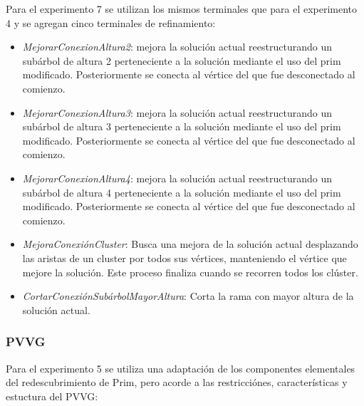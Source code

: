 Para el experimento 7 se utilizan los mismos terminales que para el experimento 4 y se agregan cinco terminales de refinamiento:

\begin{itemize}

\item \textit{MejorarConexionAltura2}: mejora la solución actual  reestructurando un subárbol de altura 2 perteneciente a la solución mediante el uso del prim modificado. Posteriormente se conecta al vértice del que fue desconectado al comienzo. 

\item \textit{MejorarConexionAltura3}: mejora la solución actual  reestructurando un subárbol de altura 3 perteneciente a la solución mediante el uso del prim modificado. Posteriormente se conecta al vértice del que fue desconectado al comienzo.

\item \textit{MejorarConexionAltura4}: mejora la solución actual  reestructurando un subárbol de altura 4 perteneciente a la solución mediante el uso del prim modificado. Posteriormente se conecta al vértice del que fue desconectado al comienzo.

\item \textit{MejoraConexiónCluster}: Busca una mejora de la solución actual desplazando las aristas de un cluster por todos sus vértices, manteniendo el vértice que mejore la solución. Este proceso finaliza cuando se recorren todos los clúster.

\item \textit{CortarConexiónSubárbolMayorAltura}: Corta la rama con mayor altura de la solución actual. 

\end{itemize}


\subsubsection*{PVVG}

Para el experimento 5 se utiliza una adaptación de los componentes elementales del redescubrimiento de Prim, pero acorde a las restricciónes, características y estuctura del PVVG:

